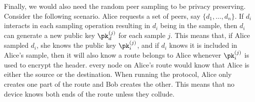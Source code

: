Finally, we would also need the random peer sampling to be privacy preserving.
Consider the following scenario.
Alice requests a set of peers, say \(\{d_1, \dotsc, d_n\}\).
If \(d_i\) interacts in each sampling operation resulting in \(d_i\) being in 
the sample, then \(d_i\) can generate a new public key \(\pk_d^{(j)}\) for each 
sample \(j\).
This means that, if Alice sampled \(d_i\), she knows the public key 
\(\pk_i^{(j)}\), and if \(d_i\) knows it is included in Alice's sample, then it 
will also know a route belongs to Alice whenever \(\pk_i^{(j)}\) is used to 
encrypt the header.
\Ie every node on Alice's route would know that Alice is either the source or 
the destination.
When running the protocol, Alice only creates one part of the route and Bob 
creates the other.
This means that no device knows both ends of the route unless they collude.





